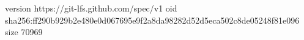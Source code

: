 version https://git-lfs.github.com/spec/v1
oid sha256:ff290b929b2e480e0d067695e9f2a8da98282d52d5eca502c8de05248f81e096
size 70969
